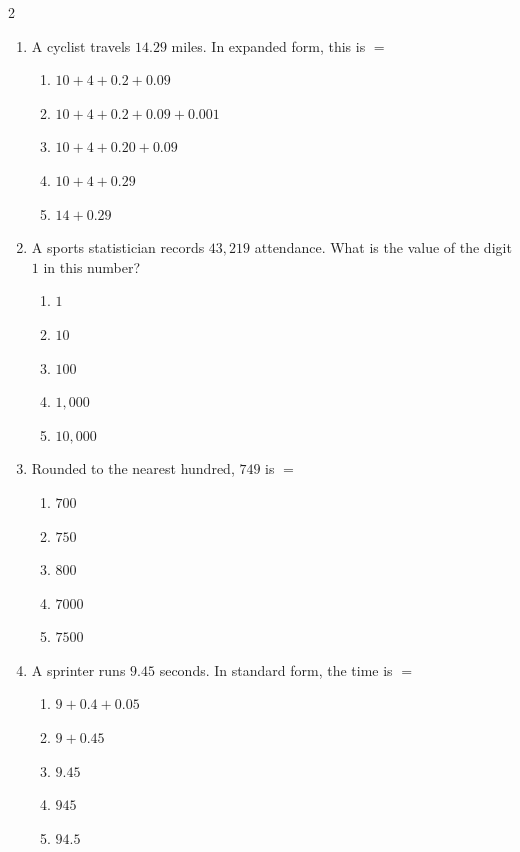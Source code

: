 \documentclass[10pt]{article}
\begin{document}
\begin{multicols}{2}
\begin{enumerate}[label=\textbf{Q\arabic*.}, leftmargin=*, itemsep=6pt, parsep=0pt]
  \item \small A cyclist travels $14.29$ miles. In expanded form, this is $=$
  \begin{enumerate}[label=(\Alph*), leftmargin=0.6cm, nosep, itemsep=2pt]
    \item $10 + 4 + 0.2 + 0.09$
    \item $10 + 4 + 0.2 + 0.09 + 0.001$
    \item $10 + 4 + 0.20 + 0.09$
    \item $10 + 4 + 0.29$
    \item $14 + 0.29$
  \end{enumerate}

  \item \small A sports statistician records $43,219$ attendance. What is the value of the digit $1$ in this number?
  \begin{enumerate}[label=(\Alph*), leftmargin=0.6cm, nosep, itemsep=2pt]
    \item $1$
    \item $10$
    \item $100$
    \item $1,000$
    \item $10,000$
  \end{enumerate}

  \item \small Rounded to the nearest hundred, $749$ is $=$
  \begin{enumerate}[label=(\Alph*), leftmargin=0.6cm, nosep, itemsep=2pt]
    \item $700$
    \item $750$
    \item $800$
    \item $7000$
    \item $7500$
  \end{enumerate}

  \item \small A sprinter runs $9.45$ seconds. In standard form, the time is $=$
  \begin{enumerate}[label=(\Alph*), leftmargin=0.6cm, nosep, itemsep=2pt]
    \item $9 + 0.4 + 0.05$
    \item $9 + 0.45$
    \item $9.45$
    \item $945$
    \item $94.5$
  \end{enumerate}


\end{enumerate}
\end{multicols}
\end{document}
